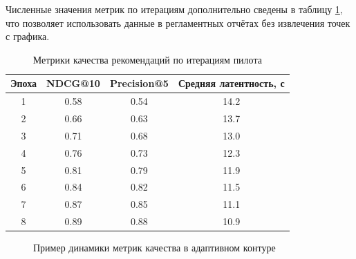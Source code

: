 Численные значения метрик по итерациям дополнительно сведены в таблицу
\ref{tab:quality-metrics-by-epoch}, что позволяет использовать данные в
регламентных отчётах без извлечения точек с графика.

\begin{table}[htbp]
  \caption{Метрики качества рекомендаций по итерациям пилота}
  \label{tab:quality-metrics-by-epoch}
  \centering

  \begin{tabular}{|c|c|c|c|}
    \hline
    Эпоха & NDCG@10 & Precision@5 & Средняя латентность, с \\
    \hline
    1 & 0.58 & 0.54 & 14.2 \\
    \hline
    2 & 0.66 & 0.63 & 13.7 \\
    \hline
    3 & 0.71 & 0.68 & 13.0 \\
    \hline
    4 & 0.76 & 0.73 & 12.3 \\
    \hline
    5 & 0.81 & 0.79 & 11.9 \\
    \hline
    6 & 0.84 & 0.82 & 11.5 \\
    \hline
    7 & 0.87 & 0.85 & 11.1 \\
    \hline
    8 & 0.89 & 0.88 & 10.9 \\
    \hline
  \end{tabular}
\end{table}

\begin{figure}[htbp]
  \centering


  \caption{Пример динамики метрик качества в адаптивном контуре}
  \label{fig:quality-dynamics}
\end{figure}

